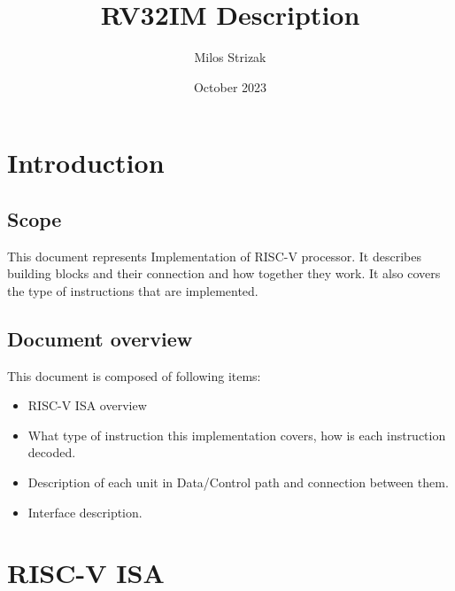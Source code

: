 \documentclass{scrreprt}
\title{RV32IM Description}
\author{Milos Strizak}
\date{October 2023}
\begin{document}
\maketitle

\section*{Introduction}
\subsection*{Scope}
This document represents Implementation of RISC-V processor. It describes building blocks and their 
connection and how together they work. It also covers the type of instructions that are implemented.
\subsection*{Document overview}
This document is composed of following items:
\begin{itemize}
    \item RISC-V ISA overview
    \item What type of instruction this implementation covers, how is each instruction decoded.
    \item Description of each unit in Data/Control path and connection between them.
    \item Interface description. 
\end{itemize}

\section*{RISC-V ISA}
\end{document}
